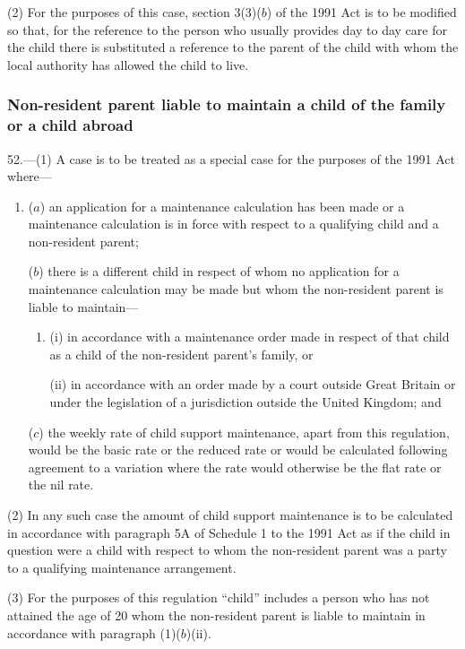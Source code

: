 \documentclass[12pt,a4paper]{article}
\begin{document}
(2) For the purposes of this case, section 3(3)($b$)  of the 1991 Act is to be modified so that, for the reference to the person who usually provides day to day care for the child there is substituted a reference to the parent of the child with whom the local authority has allowed the child to live.

\subsubsection[52. Non-resident parent liable to maintain a child of the family or a child abroad]{Non-resident parent liable to maintain a child of the family or a child abroad}

52.---(1)  A case is to be treated as a special case for the purposes of the 1991 Act where—
\begin{enumerate}\item[]
($a$) an application for a maintenance calculation has been made or a maintenance calculation is in force with respect to a qualifying child and a non-resident parent;

($b$) there is a different child in respect of whom no application for a maintenance calculation may be made but whom the non-resident parent is liable to maintain—
\begin{enumerate}\item[]
(i) in accordance with a maintenance order made in respect of that child as a child of the non-resident parent’s family, or

(ii) in accordance with an order made by a court outside Great Britain or under the legislation of a jurisdiction outside the United Kingdom; and
\end{enumerate}

($c$) the weekly rate of child support maintenance, apart from this regulation, would be the basic rate or the reduced rate or would be calculated following agreement to a variation where the rate would otherwise be the flat rate or the nil rate.
\end{enumerate}

(2) In any such case the amount of child support maintenance is to be calculated in accordance with paragraph 5A of Schedule 1 to the 1991 Act as if the child in question were a child with respect to whom the non-resident parent was a party to a qualifying maintenance arrangement.

(3) For the purposes of this regulation “child” includes a person who has not attained the age of 20 whom the non-resident parent is liable to maintain in accordance with paragraph (1)($b$)(ii).
\end{document}
